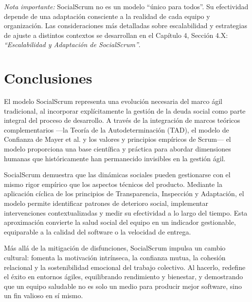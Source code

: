 \emph{Nota importante:} SocialScrum no es un modelo ``único para todos''.
Su efectividad depende de una adaptación consciente a la realidad de cada equipo y organización.
Las consideraciones más detalladas sobre escalabilidad y estrategias de ajuste a distintos contextos se desarrollan en el Capítulo 4, Sección 4.X: \textit{``Escalabilidad y Adaptación de SocialScrum''}.

\section{Conclusiones}

El modelo SocialScrum representa una evolución necesaria del marco ágil tradicional, al incorporar explícitamente la gestión de la deuda social como parte integral del proceso de desarrollo.
A través de la integración de marcos teóricos complementarios —la Teoría de la Autodeterminación (TAD), el modelo de Confianza de Mayer et al. y los valores y principios empíricos de Scrum— el modelo proporciona una base científica y práctica para abordar dimensiones humanas que históricamente han permanecido invisibles en la gestión ágil.

SocialScrum demuestra que las dinámicas sociales pueden gestionarse con el mismo rigor empírico que los aspectos técnicos del producto.
Mediante la aplicación cíclica de los principios de Transparencia, Inspección y Adaptación, el modelo permite identificar patrones de deterioro social, implementar intervenciones contextualizadas y medir su efectividad a lo largo del tiempo.
Esta aproximación convierte la salud social del equipo en un indicador gestionable, equiparable a la calidad del software o la velocidad de entrega.

Más allá de la mitigación de disfunciones, SocialScrum impulsa un cambio cultural: fomenta la motivación intrínseca, la confianza mutua, la cohesión relacional y la sostenibilidad emocional del trabajo colectivo.
Al hacerlo, redefine el éxito en entornos ágiles, equilibrando rendimiento y bienestar, y demostrando que un equipo saludable no es solo un medio para producir mejor software, sino un fin valioso en sí mismo.

\printglossary[type=\acronymtype, title={Acrónimos}]
\printglossary[style=altlist,title={Glosario}]
